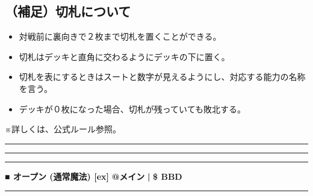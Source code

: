 \documentclass[twocolumn,a5paper,papersize,10pt]{jarticle}
\begin{document}
\subsection*{（補足）切札について}
\vspace{-1zh}%
\begin{itemize}
\setlength{\leftskip}{-0.3cm}%
\setlength{\parskip}{0pt}      %

\item 対戦前に裏向きで２枚まで切札を置くことができる。
\item 切札はデッキと直角に交わるようにデッキの下に置く。
\item 切札を表にするときはスートと数字が見えるようにし、対応する能力の名称を言う。
\item デッキが０枚になった場合、切札が残っていても敗北する。
\end{itemize}
※詳しくは、公式ルール参照。
\vspace{-1zh}%

\begin{center}
\begin{center}
\hrule height 1mm depth 0mm width 66.5mm %
\vspace{1mm}%
{\Large\bf {}}
\vspace{1mm}%
\hrule height 0.5mm depth 0mm width 66.5mm %
\end{center}
\end{center}
\vspace{-1zh}%

\vspace{2mm} %
\hrule height 0.5mm depth 0mm width 66.5mm %
\vspace{1mm} %
{\normalsize\bf ■ オープン {\scriptsize (通常魔法) [ex]}} %
\hfill 
{\small\bf @メイン }
  {\small\bf | } {\small\bf \$ BBD}


\vspace{1mm}%
\hrule height 0.1mm depth 0mm width 66.5mm %
\vspace{1mm}%
\end{document}

